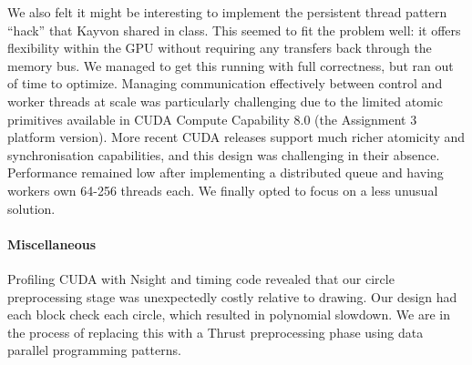 \documentclass[11pt]{article}
\begin{document}
\smallskip
We also felt it might be interesting to implement the persistent thread pattern
“hack” that Kayvon shared in class. This seemed to fit the problem well: it
offers flexibility within the GPU without requiring any transfers back through
the memory bus.  We managed to get this running with full correctness, but ran
out of time to optimize. Managing communication effectively between control and
worker threads at scale was particularly challenging due to the limited atomic
primitives available in CUDA Compute Capability 8.0 (the Assignment 3 platform
version). More recent CUDA releases support much richer atomicity and
synchronisation capabilities, and this design was challenging in their absence.
Performance remained low after implementing a distributed queue and having
workers own 64-256 threads each. We finally opted to focus on a less unusual
solution.

\paragraph{Miscellaneous} Profiling CUDA with Nsight and timing code revealed
that our circle preprocessing stage was unexpectedly costly relative to drawing.
Our design had each block check each circle, which resulted in polynomial
slowdown. We are in the process of replacing this with a Thrust preprocessing
phase using data parallel programming patterns.
\end{document}
